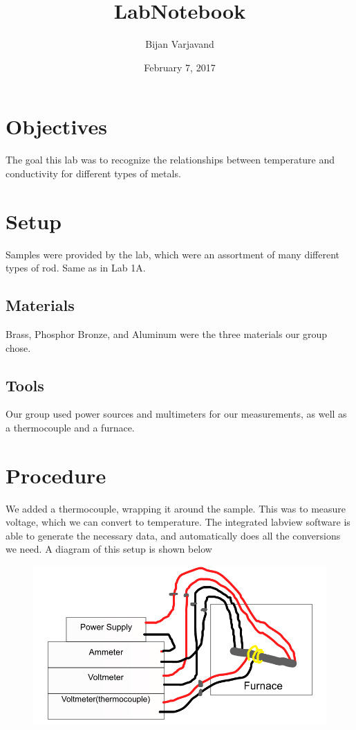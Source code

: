 \documentclass{article}
\author{Bijan Varjavand}
\title{LabNotebook}
\date{February 7, 2017}
\begin{document}
\maketitle

\section{Objectives}

The goal this lab was to recognize the relationships between temperature and conductivity for different types of metals.

\section{Setup}

Samples were provided by the lab, which were an assortment of many different types of rod. Same as in Lab 1A.
\subsection{Materials}

Brass, Phosphor Bronze, and Aluminum were the three materials our group chose.
\subsection{Tools}

Our group used power sources and multimeters for our measurements, as well as a thermocouple and a furnace.
\section{Procedure}

We added a thermocouple, wrapping it around the sample. This was to measure voltage, which we can convert to
temperature. The integrated labview software is able to generate the necessary data, and automatically
does all the conversions we need. A diagram of this setup is shown below

\begin{figure}[h!]
\centering
\includegraphics[scale=0.5]{circuit2.png}
\end{figure}
\end{document}
